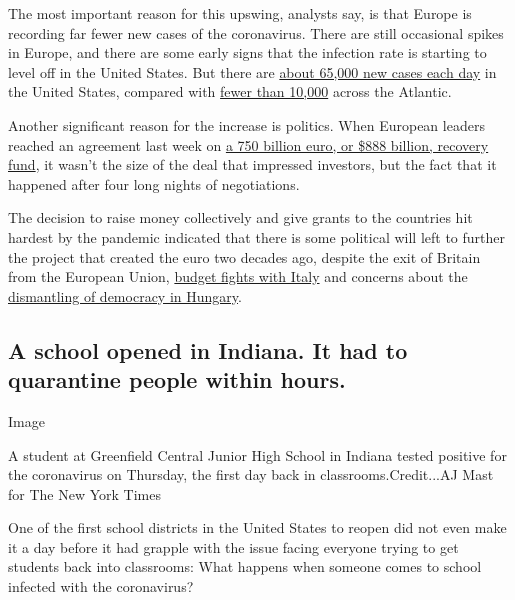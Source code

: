 The most important reason for this upswing, analysts say, is that Europe
is recording far fewer new cases of the coronavirus. There are still
occasional spikes in Europe, and there are some early signs that the
infection rate is starting to level off in the United States. But there
are
\href{https://www.nytimes.com/interactive/2020/us/coronavirus-us-cases.html?campaign_id=154\&emc=edit_cb_20200728\&instance_id=20725\&nl=coronavirus-briefing\&regi_id=137662381\&segment_id=34584\&te=1\&user_id=72eee90673e6857ae5a6e83e1981a59a}{about
65,000 new cases each day} in the United States, compared with
\href{https://www.ecdc.europa.eu/en/cases-2019-ncov-eueea}{fewer than
10,000} across the Atlantic.

Another significant reason for the increase is politics. When European
leaders reached an agreement last week on
\href{https://www.nytimes.com/2020/07/20/world/europe/eu-stimulus-coronavirus.html}{a
750 billion euro, or \$888 billion, recovery fund}, it wasn't the size
of the deal that impressed investors, but the fact that it happened
after four long nights of negotiations.

The decision to raise money collectively and give grants to the
countries hit hardest by the pandemic indicated that there is some
political will left to further the project that created the euro two
decades ago, despite the exit of Britain from the European Union,
\href{https://www.ft.com/content/92ec7bc4-9d8f-11e9-9c06-a4640c9feebb}{budget
fights with Italy} and concerns about the
\href{https://www.nytimes.com/2020/06/16/world/europe/hungary-coronavirus-orban.html}{dismantling
of democracy in Hungary}.

\hypertarget{a-school-opened-in-indiana-it-had-to-quarantine-people-within-hours}{%
\subsection{A school opened in Indiana. It had to quarantine people
within
hours.}\label{a-school-opened-in-indiana-it-had-to-quarantine-people-within-hours}}

Image

A student at Greenfield Central Junior High School in Indiana tested
positive for the coronavirus on Thursday, the first day back in
classrooms.Credit...AJ Mast for The New York Times

One of the first school districts in the United States to reopen did not
even make it a day before it had grapple with the issue facing everyone
trying to get students back into classrooms: What happens when someone
comes to school infected with the coronavirus?

